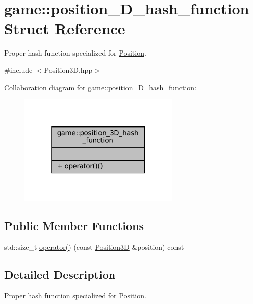 \hypertarget{structgame_1_1position__3_d__hash__function}{}\section{game\+:\+:position\+\_\+D\+\_\+hash\+\_\+function Struct Reference}
\label{structgame_1_1position__3_d__hash__function}


Proper hash function specialized for \hyperlink{structgame_1_1_position}{Position}.  




{\ttfamily \#include $<$Position3\+D.\+hpp$>$}



Collaboration diagram for game\+:\+:position\+\_\+D\+\_\+hash\+\_\+function\+:
\nopagebreak
\begin{figure}[H]
\begin{center}
\leavevmode
\includegraphics[width=217pt]{structgame_1_1position__3_d__hash__function__coll__graph}
\end{center}
\end{figure}
\subsection*{Public Member Functions}
\begin{DoxyCompactItemize}
\item 
std\+::size\+\_\+t \hyperlink{structgame_1_1position__3_d__hash__function_a2b37455862d9f2c135ecd7dab07f8781}{operator()} (const \hyperlink{structgame_1_1_position3_d}{Position3D} \&position) const
\end{DoxyCompactItemize}


\subsection{Detailed Description}
Proper hash function specialized for \hyperlink{structgame_1_1_position}{Position}. 

